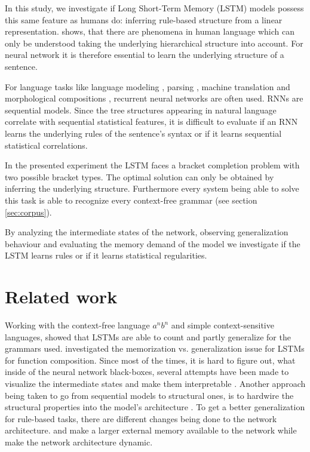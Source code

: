 \documentclass[11pt,a4paper]{article}
\begin{document}
In this study, we investigate if Long Short-Term Memory (LSTM) models \cite{hochreiter1997long} possess this same feature as humans do: inferring rule-based structure from a linear representation. \citeauthor{everaert2015structures}  shows, that there are phenomena in human language which can only be understood taking the underlying hierarchical structure into account. For neural network it is therefore essential to learn the underlying structure of a sentence.

For language tasks like language modeling \cite{mikolov2010recurrent, sundermeyer2012lstm}, parsing \cite{vinyals2015grammar, kiperwasser2016simple, dyer2016recurrent}, machine translation \cite{bahdanau2014neural} and morphological compositions \cite{kim2016character}, recurrent neural networks are often used. RNNs are sequential models. Since the tree structures appearing in natural language correlate with sequential statistical features, it is difficult to evaluate if an RNN learns the underlying rules of the sentence's syntax or if it learns sequential statistical correlations.

In the presented experiment the LSTM faces a bracket completion problem with two possible bracket types. The optimal solution can only be obtained by inferring the underlying structure. Furthermore every system being able to solve this task is able to recognize every context-free grammar (see section \ref{sec:corpus}).

By analyzing the intermediate states of the network, observing generalization behaviour and evaluating the memory demand of the model we investigate if the LSTM learns rules or if it learns statistical regularities.

\section{Related work}
Working with the context-free language $a^nb^n$ and simple context-sensitive languages, \citeauthor{gers2001lstm}  showed that LSTMs are able to count and partly generalize for the grammars used.
\citeauthor{liska2018memorize}  investigated the memorization vs. generalization issue for LSTMs for function composition. Since most of the times, it is hard to figure out, what inside of the neural network black-boxes, several attempts have been made to visualize the intermediate states \cite{rauber2017visualizing, karpathy2015visualizing} and make them interpretable \cite{krakovna2016increasing}.
Another approach being taken to go from sequential models to structural ones, is to hardwire the structural properties into the model's architecture \cite{tai2015improved, kiperwasser2016simple, joulin2015inferring}.
To get a better generalization for rule-based tasks, there are different changes being done to the network architecture. \citeauthor{graves2014neural}  and \citeauthor{sukhbaatar2015end}  make a larger external memory available to the network while \citeauthor{moshe2017deep}  make the network architecture dynamic.
\end{document}
